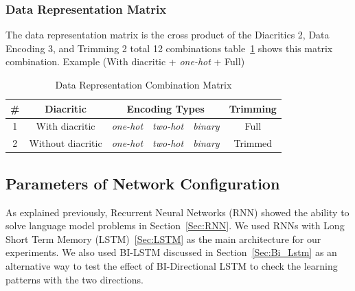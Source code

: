 \subsubsection{Data Representation Matrix}

The data representation matrix is the cross product of the Diacritics 2, Data Encoding 3, and Trimming 2 total 12 combinations table~\ref{Tab:Data_Representation_Matrix} shows this matrix combination. Example (With diacritic + \textit{one-hot} + Full)


\begin{table}[t]
 \centering
 \begin{tabular}{c c c c c c}
  \hline
  \textbf{\#} & \textbf{Diacritic} & \multicolumn{3}{c}{\textbf{Encoding Types}} & \textbf{Trimming} \\
  
  \hline
  1 & With diacritic & \textit{one-hot} & \textit{two-hot} & \textit{binary} & Full  \\
  \hline
  2 & Without diacritic & \textit{one-hot} & \textit{two-hot} & \textit{binary} & Trimmed \\
  \hline
 \end{tabular}
 \caption{Data Representation Combination Matrix}\label{Tab:Data_Representation_Matrix}
\end{table}


%   
\subsection{Parameters of Network Configuration}\label{Sec:Rnn_Param}

As explained previously, Recurrent Neural Networks (RNN) showed the ability to solve language model problems in Section~\ref{Sec:RNN}. We used RNNs with Long Short Term Memory (LSTM)~\ref{Sec:LSTM} as the main architecture for our experiments. We also used BI-LSTM discussed in Section~\ref{Sec:Bi_Lstm} as an alternative way to test the effect of BI-Directional LSTM to check the learning patterns with the two directions.

